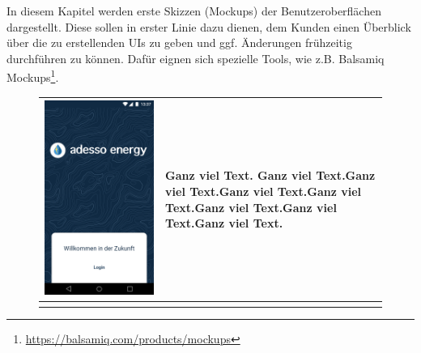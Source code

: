 \begin{tcolorbox}
In diesem Kapitel werden erste Skizzen (Mockups) der Benutzeroberflächen dargestellt.
Diese sollen in erster Linie dazu dienen, dem Kunden einen Überblick über die zu erstellenden UIs zu geben und ggf. Änderungen frühzeitig durchführen zu können.
Dafür eignen sich spezielle Tools, wie z.B. Balsamiq Mockups\footnote{\url{https://balsamiq.com/products/mockups}}.
\end{tcolorbox}

\begin{figure}[h]
\begin{tabularx}{\textwidth}{X | X}
	\includegraphics[scale = 0.22]{img/AndroidMockup/splash} & Ganz viel Text. Ganz viel Text.Ganz viel Text.Ganz viel Text.Ganz viel Text.Ganz viel Text.Ganz viel Text.Ganz viel Text. \\ \hline \\

\end{tabularx}
\end{figure}
